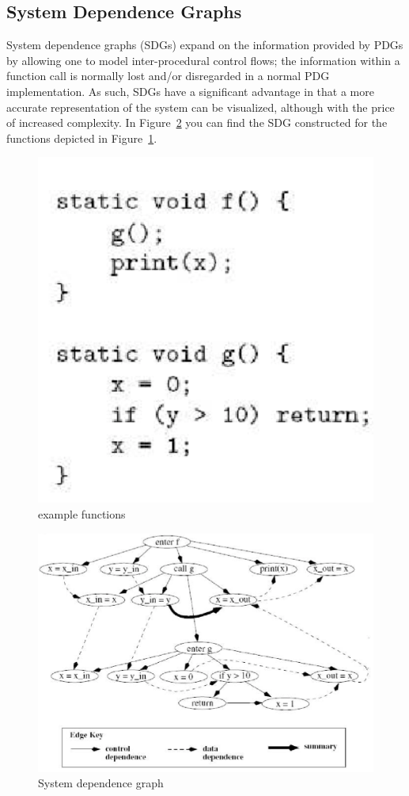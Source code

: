 \documentclass[authoryear,preprint]{sigplanconf}
\begin{document}
\subsection{System Dependence Graphs}
System dependence graphs (SDGs) expand on the information provided by PDGs by allowing one to model inter-procedural control flows; the information within a function call is normally lost and/or disregarded in a normal PDG implementation. As such, SDGs have a significant advantage in that a more accurate representation of the system can be visualized, although with the price of increased complexity. In Figure~\ref{fig4} you can find the SDG constructed for the functions depicted in Figure~\ref{fig3}.
\begin{figure}[ht]
	\centering
	\includegraphics[width=.8\linewidth]{figures/example}
         \caption[example functions]{\label{fig3}example functions}
\end{figure}

\begin{figure}[ht]
	\centering
	\includegraphics[width=.9\linewidth]{figures/sdg}
         \caption[System dependence graph]{\label{fig4}System dependence graph}
\end{figure}
\end{document}
